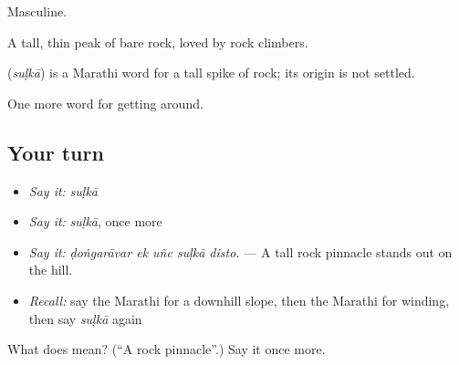 Masculine.

A tall, thin peak of bare rock, loved by rock climbers.

\begin{cousinweb}
\textbf{} (\emph{suḷkā}) is a Marathi word for a tall spike of rock; its origin is not settled.
\end{cousinweb}

\begin{grammarlens}[title={What you've built}]
One more word for getting around.
\end{grammarlens}

\subsection*{Your turn}
\begin{itemize}
\raggedright
  \item \emph{Say it:} \emph{suḷkā}
  \item \emph{Say it:} \emph{suḷkā}, once more
  \item \emph{Say it:} \emph{ḍoṅgarāvar ek uñc suḷkā disto.} — A tall rock pinnacle stands out on the hill.
  \item \emph{Recall:} say the Marathi for a downhill slope, then the Marathi for winding, then say \emph{suḷkā} again
\end{itemize}

\begin{tcolorbox}[breakable,colback=teal!4,colframe=teal!35!black,title={Before you move on}]
What does  mean? (\textquotedblleft{}A rock pinnacle\textquotedblright{}.) Say it once more.
\end{tcolorbox}

